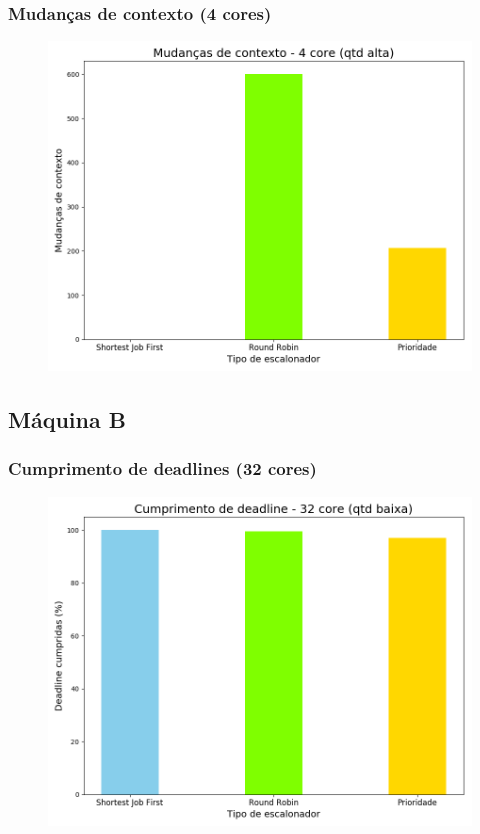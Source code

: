 \documentclass{beamer}
\begin{document}
\begin{frame}
\frametitle{Mudanças de contexto (4 cores)}
\begin{figure}
\includegraphics[scale=0.4]{ctx_long_4.png}
\end{figure}
\end{frame}

\subsection{Máquina B}

\begin{frame}
\frametitle{Cumprimento de deadlines (32 cores)}
\begin{figure}
\includegraphics[scale=0.4]{deadline_small_32.png}
\end{figure}
\end{frame}
\end{document}
